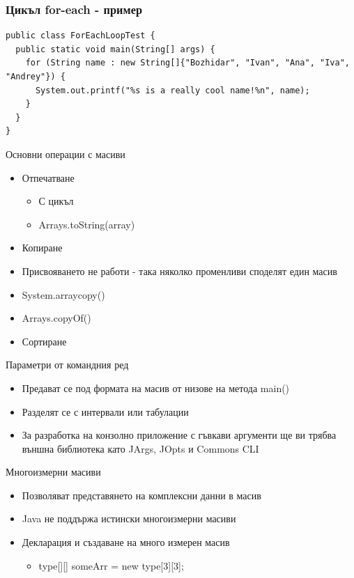 \documentclass{beamer}
\begin{document}
\begin{frame}[fragile]
  \frametitle{Цикъл for-each - пример}
  \transdissolve
\begin{lstlisting}
public class ForEachLoopTest {
  public static void main(String[] args) {
    for (String name : new String[]{"Bozhidar", "Ivan", "Ana", "Iva", "Andrey"}) {
      System.out.printf("%s is a really cool name!%n", name);
    }
  }
}  
\end{lstlisting}
\end{frame}

\begin{frame}{Основни операции с масиви}
  \transdissolve
  \begin{itemize}
    \item Отпечатване
      \begin{itemize}
        \item С цикъл
        \item Arrays.toString(array)
      \end{itemize}
    \item Копиране
      \item Присвояването не работи - така няколко променливи споделят
        един масив
      \item System.arraycopy()
      \item Arrays.copyOf()
    \item Сортиране
  \end{itemize}
\end{frame}

\begin{frame}{Параметри от командния ред}
  \transdissolve
  \begin{itemize}
  \item Предават се под формата на масив от низове на метода main()
  \item Разделят се с интервали или табулации
  \item За разработка на конзолно приложение с гъвкави аргументи ще ви
    трябва външна библиотека като JArgs, JOpts и Commons CLI
  \end{itemize}
\end{frame}

\begin{frame}{Многоизмерни масиви}
  \transdissolve
  \begin{itemize}
  \item Позволяват представянето на комплексни данни в масив
  \item Java не поддържа истински многоизмерни масиви
  \item Декларация и създаване на много измерен масив
    \begin{itemize}
      \item type[][] someArr = new type[3][3];
    \end{itemize}
  \end{itemize}
\end{frame}
\end{document}
